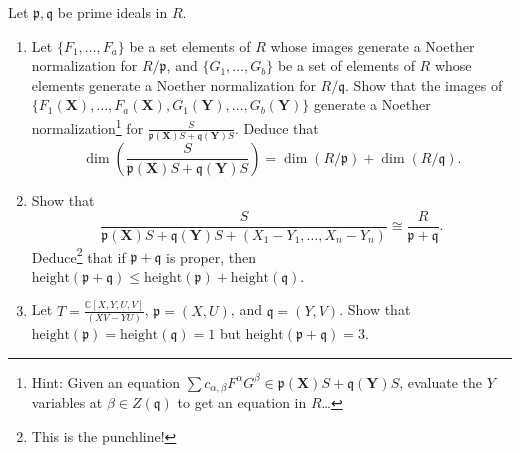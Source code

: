 \documentclass[12pt]{amsart}
\newcommand{\C}{\mathbb{C}}
\newcommand{\X}{\mathbf{X}}
\newcommand{\Y}{\mathbf{Y}}
\newcommand{\p}{\mathfrak{p}}
\newcommand{\q}{\mathfrak{q}}
\newcommand{\hgt}{\mathrm{height}}
\newcommand{\ds}{\displaystyle}
\begin{document}
\begin{enumerate}
 Let $\p,\q$ be prime ideals in $R$.
 \begin{enumerate}
\item Let $\{F_1,\dots,F_a\}$ be a set elements of $R$ whose images generate a Noether normalization for $R/\p$, and $\{G_1,\dots,G_b\}$ be a set of elements of $R$ whose elements generate a Noether normalization for $R/\q$. Show that the images of $\{F_1(\X),\dots,F_a(\X),G_1(\Y),\dots,G_b(\Y)\}$ generate a Noether normalization\footnote{Hint: Given an equation $\sum c_{\alpha,\beta} F^\alpha G^\beta \in \p(\X) S + \q(\Y) S$, evaluate the $Y$ variables at $\beta\in Z(\q)$ to get an equation in $R$\dots} for $\ds\frac{S}{\p(\X) S + \q(\Y)S}$. Deduce that 
\[\dim\left(\frac{S}{\p(\X) S + \q(\Y)S}\right) = \dim(R/\p) + \dim(R/\q).\]
\item Show that \[\frac{S}{\p(\X) S + \q(\Y)S + (X_1-Y_1,\dots,X_n-Y_n)}\cong \frac{R}{\p+\q}.\] Deduce\footnote{This is the punchline!} that if $\p+\q$ is proper, then  $\hgt(\p+\q) \leq \hgt(\p) + \hgt(\q)$.
\item Let $\ds T=\frac{\C[X,Y,U,V]}{(XV-YU)}$, $\p=(X,U)$, and $\q=(Y,V)$. Show that $\hgt(\p)=\hgt(\q)=1$ but $\hgt(\p+\q)=3$.
\end{enumerate}




\end{enumerate}
\end{document}
